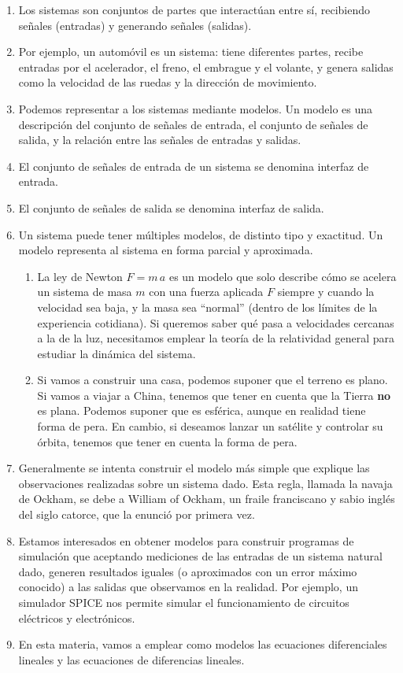 \begin{enumerate}
	
	\item Los sistemas son conjuntos de partes que interactúan entre sí, recibiendo señales (entradas) y generando señales (salidas).
	\item Por ejemplo, un automóvil es un sistema: tiene diferentes partes, recibe entradas por el acelerador, el freno, el embrague y el volante, y genera salidas como la velocidad de las ruedas y la dirección de movimiento.
	\item Podemos representar a los sistemas mediante modelos. Un modelo es una descripción del conjunto de señales de entrada, el conjunto de señales de salida, y la relación entre las señales de entradas y salidas.
	\item El conjunto de señales de entrada de un sistema se denomina interfaz de entrada.
	\item El conjunto de señales de salida se denomina interfaz de salida.
	\item Un sistema puede tener múltiples modelos, de distinto tipo y exactitud. Un modelo representa al sistema en forma parcial y aproximada.
	\begin{enumerate}
		\item La ley de Newton $F = m \, a$ es un modelo que solo describe cómo se acelera un sistema de masa $m$ con una fuerza aplicada $F$ siempre y cuando la velocidad sea baja, y la masa sea ``normal'' (dentro de los límites de la experiencia cotidiana). Si queremos saber qué pasa a velocidades cercanas a la de la luz, necesitamos emplear la teoría de la relatividad general para estudiar la dinámica del sistema.
		\item Si vamos a construir una casa, podemos suponer que el terreno es plano. Si vamos a viajar a China, tenemos que tener en cuenta que la Tierra \textbf{no} es plana. Podemos suponer que es esférica, aunque en realidad tiene forma de pera. En cambio, si deseamos lanzar un satélite y controlar su órbita, tenemos que tener en cuenta la forma de pera.
	\end{enumerate}
	\item Generalmente se intenta construir el modelo más simple que explique las observaciones realizadas sobre un sistema dado. Esta regla, llamada la navaja de Ockham, se debe a William of Ockham, un fraile franciscano y sabio inglés del siglo catorce, que la enunció por primera vez.
	\item Estamos interesados en obtener modelos para construir programas de simulación que aceptando mediciones de las entradas de un sistema natural dado, generen resultados iguales (o aproximados con un error máximo conocido) a las salidas que observamos en la realidad. Por ejemplo, un simulador SPICE nos permite simular el funcionamiento de circuitos eléctricos y electrónicos.
	\item En esta materia, vamos a emplear como modelos las ecuaciones diferenciales lineales y las ecuaciones de diferencias lineales.
\end{enumerate}


